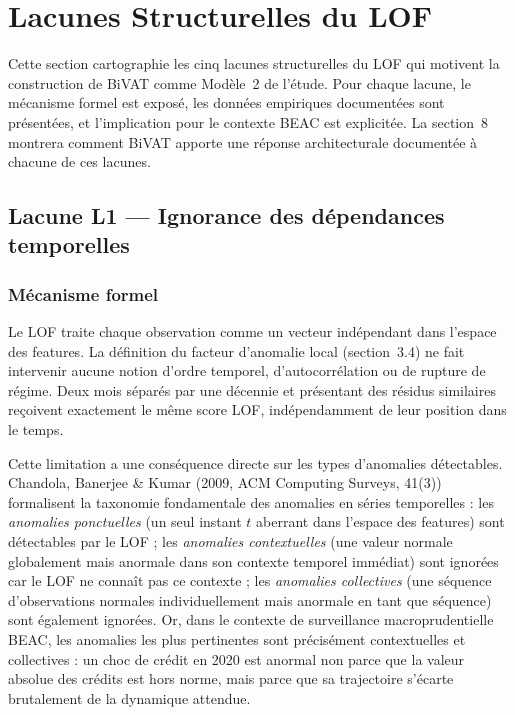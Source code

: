 \documentclass[12pt,a4paper]{article}
\begin{document}
\section{Lacunes Structurelles du LOF}

Cette section cartographie les cinq lacunes structurelles du LOF qui
motivent la construction de BiVAT comme Modèle~2 de l'étude. Pour chaque
lacune, le mécanisme formel est exposé, les données empiriques documentées
sont présentées, et l'implication pour le contexte BEAC est explicitée.
La section~8 montrera comment BiVAT apporte une réponse architecturale
documentée à chacune de ces lacunes.

\subsection{Lacune L1 --- Ignorance des dépendances temporelles}

\subsubsection{Mécanisme formel}

Le LOF traite chaque observation comme un vecteur indépendant dans l'espace
des features. La définition du facteur d'anomalie local (section~3.4) ne fait
intervenir aucune notion d'ordre temporel, d'autocorrélation ou de rupture de
régime. Deux mois séparés par une décennie et présentant des résidus similaires
reçoivent exactement le même score LOF, indépendamment de leur position dans
le temps.

Cette limitation a une conséquence directe sur les types d'anomalies
détectables. Chandola, Banerjee \& Kumar (2009, ACM Computing Surveys, 41(3))
formalisent la taxonomie fondamentale des anomalies en séries temporelles :
les \textit{anomalies ponctuelles} (un seul instant $t$ aberrant dans l'espace
des features) sont détectables par le LOF ; les \textit{anomalies contextuelles}
(une valeur normale globalement mais anormale dans son contexte temporel
immédiat) sont ignorées car le LOF ne connaît pas ce contexte ; les
\textit{anomalies collectives} (une séquence d'observations normales
individuellement mais anormale en tant que séquence) sont également ignorées.
Or, dans le contexte de surveillance macroprudentielle BEAC, les anomalies
les plus pertinentes sont précisément contextuelles et collectives : un choc
de crédit en 2020 est anormal non parce que la valeur absolue des crédits est
hors norme, mais parce que sa trajectoire s'écarte brutalement de la dynamique
attendue.
\end{document}
